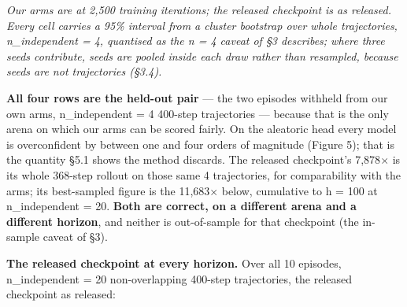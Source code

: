 \documentclass[10pt]{article}
\begin{document}
\emph{Our arms are at 2,500 training iterations; the released checkpoint is as released. Every cell carries a 95\% interval from a cluster bootstrap over whole trajectories, n\_independent = 4, quantised as the n = 4 caveat of \S{}3 describes; where three seeds contribute, seeds are pooled inside each draw rather than resampled, because seeds are not trajectories (\S{}3.4).}

\textbf{All four rows are the held-out pair} --- the two episodes withheld from our own arms, n\_independent = 4 400-step trajectories --- because that is the only arena on which our arms can be scored fairly. On the aleatoric head every model is overconfident by between one and four orders of magnitude (Figure 5); that is the quantity \S{}5.1 shows the method discards. The released checkpoint's 7,878$\times$ is its whole 368-step rollout on those same 4 trajectories, for comparability with the arms; its best-sampled figure is the 11,683$\times$ below, cumulative to h = 100 at n\_independent = 20. \textbf{Both are correct, on a different arena and a different horizon}, and neither is out-of-sample for that checkpoint (the in-sample caveat of \S{}3).

\textbf{The released checkpoint at every horizon.} Over all 10 episodes, n\_independent = 20 non-overlapping 400-step trajectories, the released checkpoint as released:

\begin{center}\small{}\end{center}
\end{document}

